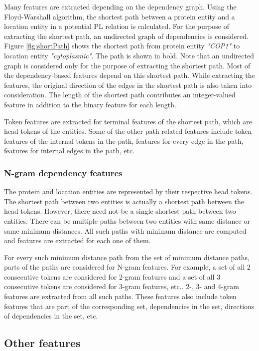 Many features are extracted depending on the dependency graph. Using the Floyd-Warshall algorithm, the shortest path between a protein entity and a location entity in a potential PL relation is calculated. For the purpose of extracting the shortest path, an undirected graph of dependencies is considered. Figure \ref{fig:shortPath} shows the shortest path from protein entity \textit{"COP1"} to location entity \textit{"cytoplasmic"}. The path is shown in bold. Note that an undirected graph is considered only for the purpose of extracting the shortest path. Most of the dependency-based features depend on this shortest path. While extracting the features, the original direction of the edges in the shortest path is also taken into consideration. The length of the shortest path contributes an integer-valued feature in addition to the binary feature for each length.

Token features are extracted for terminal features of the shortest path, which are head tokens of the entities. Some of the other path related features include token features of the internal tokens in the path, features for every edge in the path, features for internal edges in the path, etc.

\subsubsection*{N-gram dependency features}

The protein and location entities are represented by their respective head tokens. The shortest path between two entities is actually a shortest path between the head tokens. However, there need not be a single shortest path between two entities. There can be multiple paths between two entities with same distance or same minimum distances. All such paths with minimum distance are computed and features are extracted for each one of them.

For every such minimum distance path from the set of minimum distance paths, parts of the paths are considered for N-gram features. For example, a set of all 2 consecutive tokens are considered for 2-gram features and a set of all 3 consecutive tokens are considered for 3-gram features, etc.. 2-, 3- and 4-gram features are extracted from all such paths. These features also include token features that are part of the corresponding set, dependencies in the set, directions of dependencies in the set, etc.

\subsection*{Other features}

